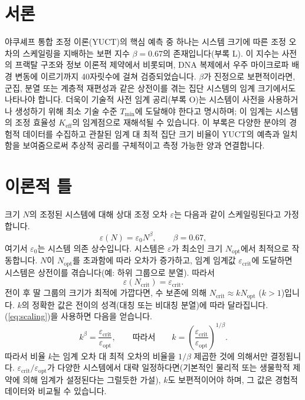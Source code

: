 \documentclass[12pt]{article}
\theoremstyle{remark}
\newcommand{\Keff}{K_{\mathrm{eff}}}
\newcommand{\Tmin}{T_{\min}}
\begin{document}
	\tableofcontents
	\newpage
	
	\section{서론}
	\label{sec:intro}
	
	야쿠셰프 통합 조정 이론(YUCT)의 핵심 예측 중 하나는 시스템 크기에 따른 조정 오차의 스케일링을 지배하는 보편 지수 \(\beta = 0.67\)의 존재입니다(부록 L). 이 지수는 사전의 프랙탈 구조와 정보 이론적 제약에서 비롯되며, DNA 복제에서 우주 마이크로파 배경 변동에 이르기까지 40자릿수에 걸쳐 검증되었습니다. \(\beta\)가 진정으로 보편적이라면, 군집, 분열 또는 계층적 재편성과 같은 상전이를 겪는 집단 시스템의 임계 크기에서도 나타나야 합니다. 더욱이 기술적 사전 임계 공리(부록 O)는 시스템이 사전을 사용하거나 생성하기 위해 최소 기술 수준 \(\Tmin\)에 도달해야 한다고 명시하며; 이 임계는 시스템의 조정 효율성 \(\Keff\)의 임계점으로 재해석될 수 있습니다. 이 부록은 다양한 분야의 경험적 데이터를 수집하고 관찰된 임계 대 최적 집단 크기 비율이 YUCT의 예측과 일치함을 보여줌으로써 추상적 공리를 구체적이고 측정 가능한 양과 연결합니다.
	
	\section{이론적 틀}
	\label{sec:theory}
	
	크기 \(N\)의 조정된 시스템에 대해 상대 조정 오차 \(\varepsilon\)는 다음과 같이 스케일링된다고 가정합니다.
	\begin{equation}
		\varepsilon(N) = \varepsilon_0 N^{\beta}, \qquad \beta = 0.67,
		\label{eq:scaling}
	\end{equation}
	여기서 \(\varepsilon_0\)는 시스템 의존 상수입니다. 시스템은 \(\varepsilon\)가 최소인 크기 \(N_{\text{opt}}\)에서 최적으로 작동합니다. \(N\)이 \(N_{\text{opt}}\)를 초과함에 따라 오차가 증가하고, 임계 임계값 \(\varepsilon_{\text{crit}}\)에 도달하면 시스템은 상전이를 겪습니다(예: 하위 그룹으로 분열). 따라서
	\begin{equation}
		\varepsilon(N_{\text{crit}}) = \varepsilon_{\text{crit}}.
	\end{equation}
	전이 후 딸 그룹의 크기가 최적에 가깝다면, 수 보존에 의해 \(N_{\text{crit}} \approx k N_{\text{opt}}\) (\(k > 1\))입니다. \(k\)의 정확한 값은 전이의 성격(대칭 또는 비대칭 분열)에 따라 달라집니다. (\ref{eq:scaling})을 사용하면 다음을 얻습니다.
	\begin{equation}
		k^{\beta} = \frac{\varepsilon_{\text{crit}}}{\varepsilon_{\text{opt}}}, 
		\qquad\text{따라서}\qquad 
		k = \left( \frac{\varepsilon_{\text{crit}}}{\varepsilon_{\text{opt}}} \right)^{1/\beta}.
		\label{eq:k}
	\end{equation}
	따라서 비율 \(k\)는 임계 오차 대 최적 오차의 비율을 \(1/\beta\) 제곱한 것에 의해서만 결정됩니다. \(\varepsilon_{\text{crit}}/\varepsilon_{\text{opt}}\)가 다양한 시스템에서 대략 일정하다면(기본적인 물리적 또는 생물학적 제약에 의해 임계가 설정된다는 그럴듯한 가설), \(k\)도 보편적이어야 하며, 그 값은 경험적 데이터와 비교될 수 있습니다.
	
\end{document}
